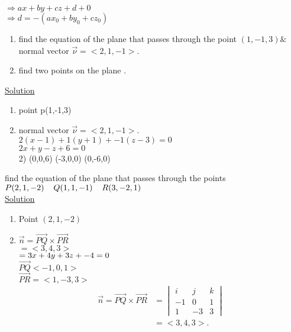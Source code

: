 $\Rightarrow  ax + by +cz +d + 0 $\\
$\Rightarrow  d = -(ax_0 + by_0 + cz_0 )$\\
 \noindent{\color{smalt(darkpowderblue)}\rule{\linewidth}{.2mm}}
\begin{example}
 \begin{enumerate}
     \item find the equation of the plane that passes through the point $(1,-1,3) \&$  normal vector $\overrightarrow{\nu} = <2,1,-1> .$
     \item find two points on the plane .
 \end{enumerate}
{\color{smalt(darkpowderblue)}\underline{Solution}}
\begin{enumerate}
    \item point p(1,-1,3) 
    \item normal vector $\overrightarrow{\nu} = <2,1,-1> .$\\
$2(x-1) + 1(y+1) + -1(z-3) = 0 $\\
$ 2x +y -z +6 = 0$\\
2) (0,0,6)
(-3,0,0)
(0,-6,0) 
\end{enumerate}
\end{example} 
 \noindent{\color{smalt(darkpowderblue)}\rule{\linewidth}{.2mm}}
\begin{example}
 find the equation of the plane that passes through the points
$P(2,1,-2) \hspace{.4cm} Q(1,1,-1)\hspace{.4cm} R(3,-2,1)$ \\
{\color{smalt(darkpowderblue)}\underline{Solution}}
\begin{enumerate}
    \item  Point $(2,1,-2)$
    \item $\overrightarrow{n} = \overrightarrow{PQ} \times \overrightarrow{PR}$\\
$=<3,4,3>$\\
$=3x + 4y  + 3z + -4\\ = 0$\\
$\overrightarrow{PQ} <-1,0,1>$\\
$\overrightarrow{PR} = <1,-3,3>$
\begin{align*}
\overrightarrow{n} = \overrightarrow{PQ} \times \overrightarrow{PR}
&=\begin{vmatrix}
 i & j & k \\
  -1 & 0 & 1 \\
  1 & -3 & 3 
 \end{vmatrix}\\
 & =<3,4,3>.
 \end{align*}
\end{enumerate}
\end{example}
